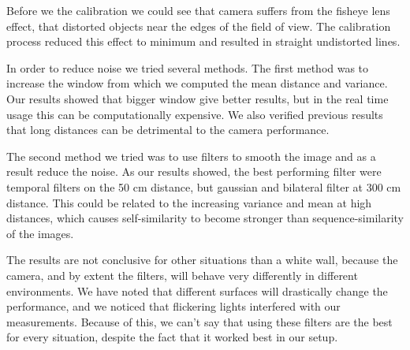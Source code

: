 \documentclass[11pt]{article}
\begin{document}
Before we the calibration we could see that camera suffers from the fisheye lens
effect, that distorted objects near the edges of the field of view. The
calibration process reduced this effect to minimum and resulted in straight
undistorted lines. \par

In order to reduce noise we tried several methods. The first method was to
increase the window from which we computed the mean distance and variance. Our
results showed that bigger window give better results, but in the real time
usage this can be computationally expensive. We also verified previous results
that long distances can be detrimental to the camera performance. \par

The second method we tried was to use filters to smooth the image and as a
result reduce the noise. As our results showed, the best performing filter were
temporal filters on the 50 cm distance, but gaussian and bilateral filter at 300
cm distance. This could be related to the increasing variance and mean at high
distances, which causes self-similarity to become stronger than
sequence-similarity of the images. \par

The results are not conclusive for other situations than a white wall, because
the camera, and by extent the filters, will behave very differently in different
environments. We have noted that different surfaces will drastically change the
performance, and we noticed that flickering lights interfered with our
measurements. Because of this, we can't say that using these filters are the
best for every situation, despite the fact that it worked best in our
setup. \par
\end{document}

